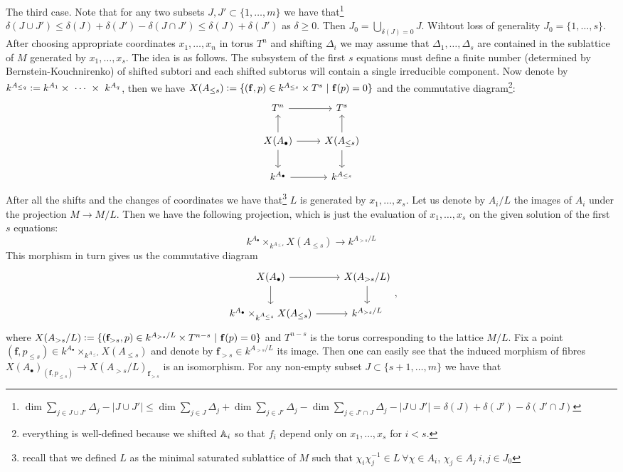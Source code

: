 The third case. Note that for any two subsets $J, J' \subset \{1, \dots, m \}$ we have that\footnote{$\dim \sum_{j \in J \cup J'} \Delta_j - |J \cup J'| \le \dim \sum_{j \in J} \Delta_j + \dim \sum_{j \in J'} \Delta_j - \dim \sum_{j \in J' \cap J} \Delta_j - |J \cup J'| = \delta(J) + \delta(J') - \delta(J' \cap J)$} $\delta(J \cup J') \le \delta(J) + \delta(J') - \delta(J \cap J') \le \delta(J) + \delta(J')$ as $\delta \ge 0$. Then $J_0 = \bigcup_{\delta(J) = 0} J$. Wihtout loss of generality $J_0 = \{ 1, \dots, s\}$. After choosing appropriate coordinates $x_1, \dots, x_n$ in torus $T^n$ and shifting $\Delta_i$ we may assume that $\Delta_1, \dots, \Delta_s$ are contained in the sublattice of $M$ generated by $x_1, \dots, x_s$. The idea is as follows. The subsystem of the first $s$ equations must define a finite number (determined by Bernstein-Kouchnirenko) of shifted subtori and each shifted subtorus will contain a single irreducible component. Now denote by $k^{A_{\le q}} \vcentcolon= k^{A_1} \times ~\cdots ~\times ~k^{A_q}$, then we have $X(A_{\le s}) \vcentcolon= \{ (\mathbf f, p) \in k^{A_{\le s}} \times T^s\ |\ \mathbf{f}(p) = 0 \}$ and the commutative diagram\footnote{everything is well-defined because we shifted $\mathbb A_i$ so that $f_i$ depend only on $x_1, \dots, x_s$ for $i < s$.}:
\[
\begin{tikzcd}
    T^n \arrow{r} & T^s \\
    \arrow{u} X(A_\bullet) \arrow{r} \arrow{d} & X(A_{\le s}) \arrow{u} \arrow{d} \\
    k^{A_\bullet} \arrow{r} & k^{A_{\le s}} 
\end{tikzcd}
\]
After all the shifts and the changes of coordinates we have that\footnote{recall that we defined $L$ as the minimal saturated sublattice of $M$ such that $\chi_i \chi_j^{-1} \in L\ \forall \chi \in A_i$, $\chi_j \in A_j\ i, j \in J_0$ } $L$ is generated by $x_1, \dots, x_s$. Let us denote by $A_i/L$ the images of $A_i$ under the projection $M \to M/L$. Then we have the following projection, which is just the evaluation of $x_1, \dots, x_s$ on the given solution of the first $s$ equations:
\[
k^{A_\bullet} \times_{k^{A_{\le s}}} X(A_{\le s}) \to k^{A_{> s}/L}
\]
This morphism in turn gives us the commutative diagram
\[
\begin{tikzcd}
    X(A_\bullet) \arrow{r} \arrow{d} & X(A_{> s}/L) \arrow{d} \\
    k^{A_\bullet} \times_{k^{A_{\le s}}} X(A_{\le s}) \arrow{r} & k^{A_{> s}/L}
\end{tikzcd},
\]
where $X(A_{>s}/L) \defeq \{ (\mathbf f_{> s}, p) \in k^{A_{> s}/L} \times T^{n - s}\ |\ \mathbf f(p) = 0 \}$ and $T^{n - s}$ is the torus corresponding to the lattice $M/L$. Fix a point $(\mathbf f, p_{\le s}) \in k^{A_\bullet} \times_{k^{A_{\le s}}} X(A_{\le s})$ and denote by $\mathbf f_{> s} \in k^{A_{> s}/L}$ its image. Then one can easily see that the induced morphism of fibres $X(A_\bullet)_{(\mathbf f, p_{\le s})} \to X(A_{> s}/L)_{\mathbf f_{> s}}$ is an isomorphism. For any non-empty subset $J \subset \{ s + 1, \dots, m \}$ we have that 
